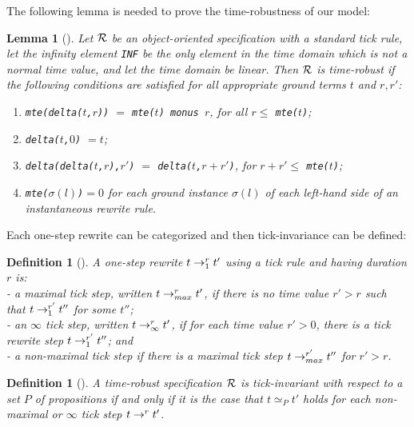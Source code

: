 \documentclass[10pt,journal]{IEEEtran}
\newtheorem{lemma}[theorem]{Lemma}
\newtheorem{definition}[theorem]{Definition}
\begin{document}
The following lemma is needed to prove the time-robustness of our
model:
\begin{lemma}[\cite{DBLP:journals/entcs/OlveczkyM07a}]
\label{l:timerobustness}
Let $\cal R$ be an object-oriented specification with a standard tick
rule, let the infinity element \verb|INF| be the only element in the
time domain which is not a normal time value, and let the time domain
be \emph{linear}. Then $\cal R$ is time-robust if the following
conditions are satisfied for all appropriate ground terms $t$ and
$r,r'$:
\begin{enumerate}
\item
[(i)] \verb|mte(delta(|$t$\verb|,|$r$\verb|))| $=$
\verb|mte(|$t$\verb|) monus |$r$, for all $r\le$
\verb|mte(|$t$\verb|)|;

\item
[(ii)] \verb|delta(|$t$\verb|,|$0$\verb|)| $= t$;

\item
[(iii)] \verb|delta(delta(|$t$\verb|,|$r$\verb|),|$r'$\verb|)| $=$
\verb|delta(|$t$\verb|,|$r+r'$\verb|)|, for $r+r'\le$
\verb|mte(|$t$\verb|)|;

\item
[(iv)] \verb|mte(|$\sigma(l)$\verb|)|$= 0$ for each ground instance
$\sigma(l)$ of each left-hand side of an instantaneous rewrite rule.
\end{enumerate}
\end{lemma}

Each one-step rewrite can be categorized and then tick-invariance can
be defined:
\begin{definition}[\cite{DBLP:journals/entcs/OlveczkyM07a}]
A one-step rewrite $t\rightarrow^{r}_{1}t'$ using a tick rule and having
duration $r$ is:\\
- a \emph{maximal tick step}, written $t\rightarrow^{r}_{max}t'$, if there is
no time value $r'>r$ such that $t\rightarrow^{r'}_{1}t''$ for some $t''$; \\
- an \emph{$\infty$ tick step}, written $t\rightarrow^{r}_{\infty}t'$, if
for each time value $r'>0$, there is a tick rewrite step
$t\rightarrow^{r'}_{1}t''$; and \\
- a \emph{non-maximal tick step} if there is a maximal tick step
$t\rightarrow^{r'}_{max}t''$ for $r'>r$.
\end{definition}
\begin{definition}[\cite{DBLP:journals/entcs/OlveczkyM07a}]
  A time-robust specification $\cal R$ is \emph{tick-invariant} with
  respect to a set $P$ of propositions if and only if it is the case
  that $t\simeq_P t'$ holds for each non-maximal or $\infty$ tick step
  $t\rightarrow^{r}_{}t'$.
\end{definition}
\end{document}
